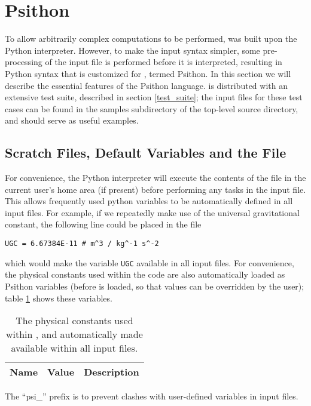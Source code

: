 \section{Psithon} \label{psithon}
 
To allow arbitrarily complex computations to be performed, \PSIfour was built
upon the Python interpreter. However, to make the input syntax simpler, some
pre-processing of the input file is performed before it is interpreted,
resulting in Python syntax that is customized for \PSI, termed Psithon.  In
this section we will describe the essential features of the Psithon language.
\PSIfour is distributed with an extensive test suite, described in section
\ref{test_suite}; the input files for these test cases can be found in the
samples subdirectory of the top-level \PSIfour source directory, and should
serve as useful examples.

\subsection{Scratch Files, Default Variables and the \psirc File} \label{sec:Psirc}
For convenience, the Python interpreter will execute the contents of the
\psirc file in the current user's home area (if present) before performing any
tasks in the input file.  This allows frequently used python variables to be
automatically defined in all input files.  For example, if we repeatedly make
use of the universal gravitational constant, the following line could be placed
in the \psirc file
\begin{verbatim}
UGC = 6.67384E-11 # m^3 / kg^-1 s^-2
\end{verbatim}
which would make the variable {\tt UGC} available in all \PSIfour input files.
For convenience, the physical constants used within the \PSIfour code are also
automatically loaded as Psithon variables (before \psirc is loaded, so that
\psirc values can be overridden by the user); table \ref{tab:physconst} shows
these variables.
\begin{table}[h!]
    \caption{The physical constants used within \PSIfour, and automatically
             made available within all \PSIfour input files.}
    \label{tab:physconst}
    \setlength{\tabcolsep}{1pt}
    \small
    \begin{tabular}{lll}
        \hline
        \hline
        Name & Value & Description \\
        \hline
        
        \hline
        \hline
    \end{tabular}
\end{table}
The ``psi\_'' prefix is to prevent clashes with user-defined variables in
\PSIfour input files.

